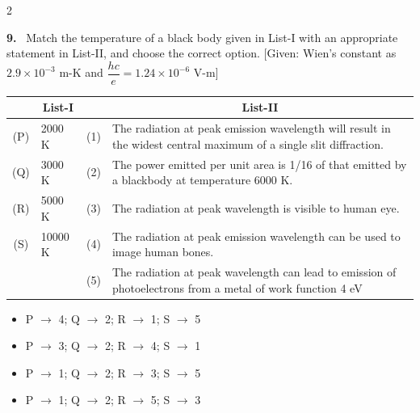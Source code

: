 \documentclass[10pt]{extarticle}
\newcommand{\qn}[1]{\par\smallskip\noindent\textbf{#1.}~}
\newenvironment{qoptions}{\begin{itemize}[leftmargin=1.8em,itemsep=1pt,topsep=2pt,label={}]}{\end{itemize}}
\newcommand{\opt}[2]{\item[(#1)] #2}
\begin{document}
\begin{multicols}{2}
\qn{9} Match the temperature of a black body given in List-I with an appropriate statement in List-II, and choose the correct option. [Given: Wien's constant as $2.9\times10^{-3}$ m-K and $\dfrac{hc}e=1.24\times10^{-6}$ V-m]\par\nobreak
\begin{center}\small\setlength{\tabcolsep}{3pt}
\begin{tabular}{|c|p{1.1cm}|c|p{4.6cm}|}
\hline
 & \multicolumn{1}{c|}{\textbf{List-I}} & & \multicolumn{1}{c|}{\textbf{List-II}} \\
\hline
(P) & 2000 K & (1) & The radiation at peak emission wavelength will result in the widest central maximum of a single slit diffraction. \\
\hline
(Q) & 3000 K & (2) & The power emitted per unit area is 1/16 of that emitted by a blackbody at temperature 6000 K. \\
\hline
(R) & 5000 K & (3) & The radiation at peak wavelength is visible to human eye. \\
\hline
(S) & 10000 K & (4) & The radiation at peak emission wavelength can be used to image human bones. \\
\hline
 & & (5) & The radiation at peak wavelength can lead to emission of photoelectrons from a metal of work function 4 eV \\
\hline
\end{tabular}
\end{center}
\begin{qoptions}
\opt{A}{P $\to$ 4; Q $\to$ 2; R $\to$ 1; S $\to$ 5}
\opt{B}{P $\to$ 3; Q $\to$ 2; R $\to$ 4; S $\to$ 1}
\opt{C}{P $\to$ 1; Q $\to$ 2; R $\to$ 3; S $\to$ 5}
\opt{D}{P $\to$ 1; Q $\to$ 2; R $\to$ 5; S $\to$ 3}
\end{qoptions}


\end{multicols}
\end{document}
